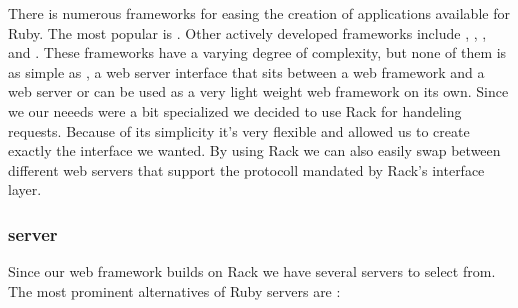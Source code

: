 There is numerous frameworks for easing the creation of 
applications available for Ruby. The most popular%
is .%
Other actively developed frameworks include
,
,
, and
.%
These frameworks have a varying degree of complexity, but none of them
is as simple as ,%
a web server interface that sits between a web framework and a web
server or can be used as a very light weight web framework on its own.
Since we our neeeds were a bit specialized we decided to use Rack for
handeling  requests. Because of its simplicity it's very
flexible and allowed us to create exactly the  interface
we wanted. By using Rack we can also easily swap between different
web servers that support the protocoll mandated by Rack's interface layer.

\subsubsection{ server}

Since our web framework builds on Rack we have several
 servers to select from. The most prominent alternatives
of Ruby servers are%
:


